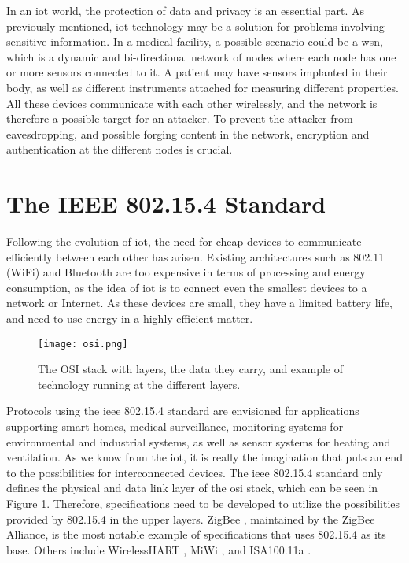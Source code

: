 In an \gls{iot} world, the protection of data and privacy is an essential part. As previously mentioned, \gls{iot} technology may be a solution for problems involving sensitive information. In a medical facility, a possible scenario could be a \gls{wsn}, which is a dynamic and bi-directional network of nodes where each node has one or more sensors connected to it. A patient may have sensors implanted in their body, as well as different instruments attached for measuring different properties. All these devices communicate with each other wirelessly, and the network is therefore a possible target for an attacker. To prevent the attacker from eavesdropping, and possible forging content in the network, encryption and authentication at the different nodes is crucial.








\section{The IEEE 802.15.4 Standard}
\label{sec:802154}

Following the evolution of \gls{iot}, the need for cheap devices to communicate efficiently between each other has arisen. Existing architectures such as 802.11 (WiFi) and Bluetooth are too expensive in terms of processing and energy consumption, as the idea of \gls{iot} is to connect even the smallest devices to a network or Internet. As these devices are small, they have a limited battery life, and need to use energy in a highly efficient matter.

\begin{figure}[h]
	\centering
	\texttt{[image: osi.png]}
	\caption{The OSI stack with layers, the data they carry, and example of technology running at the different layers.}
	\label{fig:osi}
\end{figure}

Protocols using the \gls{ieee} 802.15.4 standard are envisioned for applications supporting smart homes, medical surveillance, monitoring systems for environmental and industrial systems, as well as sensor systems for heating and ventilation. As we know from the \gls{iot}, it is really the imagination that puts an end to the possibilities for interconnected devices. The \gls{ieee} 802.15.4 standard only defines the physical and data link layer of the \gls{osi} stack, which can be seen in Figure \ref{fig:osi}. Therefore, specifications need to be developed to utilize the possibilities provided by 802.15.4 in the upper layers. ZigBee \cite{zigbee}, maintained by the ZigBee Alliance, is the most notable example of specifications that uses 802.15.4 as its base. Others include WirelessHART \citep{wirelesshart}, MiWi \cite{miwi}, and ISA100.11a \cite{isa100}.

